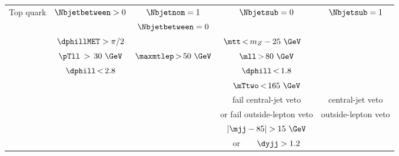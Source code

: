 \begin{tabular}{c|| c | c | c | c}
    \midrule
    \multirow{10}{*}{Top quark}   & \multirow{2}{*}{$\Nbjetbetween>0$}                   & $\Nbjetnom = 1$                                               & \multirow{2}{*}{$\Nbjetsub=0$} & \multirow{2}{*}{$\Nbjetsub=1$} \\
                                        &                                                      & $\Nbjetbetween  = 0$                                          &                                &                                \\ \cline{3-5}
                                        & $\dphillMET > \pi/2$                                 & \multicolumn{3}{c}{\phantom{ccccc}$\mtt\,{<}\,m_Z - 25~\GeV$}                                                                   \\ \cline{3-5}
                                        & $\pTll\, > \, 30~\GeV$                               & $\maxmtlep\,{>}\,50~\GeV$                                     & $\mll\,{>}\,80~\GeV$           &                                \\
                                        & $\dphill\,{<}\,2.8$                                  &                                                               & $\dphill\,{<}\,1.8$            &                                \\
                                        &                                                      &                                                               & $\mTtwo\,{<}\,165~\GeV$        &                                \\ \cline{4-4}
                                        &                                                      &                                                               & fail central-jet veto          & central-jet veto               \\
                                        &                                                      &                                                               & or fail outside-lepton veto    & outside-lepton veto            \\ \cline{4-4}
                                        &                                                      &                                                               & $|\mjj-85| > 15~\GeV$          &                                \\
                                        &                                                      &                                                               & or\ \ \ \ $\dyjj > 1.2$        &                                \\

\end{tabular}
